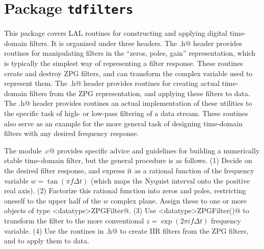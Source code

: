 \chapter{Package \texttt{tdfilters}}

This package covers LAL routines for constructing and applying digital
time-domain filters.  It is organized under three headers.  The
\verb@ZPGFilter.h@ header provides routines for manipulating filters
in the ``zeros, poles, gain'' representation, which is typically the
simplest way of representing a filter response.  These routines create
and destroy ZPG filters, and can transform the complex variable used
to represent them.  The \verb@IIRFilter.h@ header provides routines
for creating actual time-domain filters from the ZPG representation,
and applying these filters to data.  The \verb@BandPassTimeSeries.h@
header provides routines an actual implementation of these utilities
to the specific task of high- or low-pass filtering of a data stream.
These routines also serve as an example for the more general task of
designing time-domain filters with any desired frequency response.

The module \verb@ButterworthTimeSeries.c@ provides specific advice and
guidelines for building a numerically stable time-domain filter, but
the general procedure is as follows.  (1) Decide on the desired filter
response, and express it as a rational function of the frequency
variable $w=\tan(\pi f\Delta t)$ (which maps the Nyquist interval onto
the positive real axis).  (2) Factorize this rational function into
zeros and poles, restricting oneself to the upper half of the $w$
complex plane.  Assign these to one or more objects of type
\verb@<datatype>ZPGFilter@.  (3) Use \verb@WToZ<datatype>ZPGFilter()@
to transform the filter to the more conventional $z=\exp(2\pi if\Delta
t)$ frequency variable.  (4) Use the routines in \verb@IIRFilter.h@ to
create IIR filters from the ZPG filters, and to apply them to data.

\newpage
\newpage
\newpage
